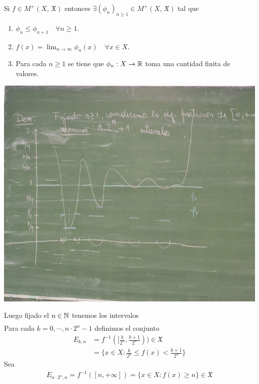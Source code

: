 Si $f \in M^+(X \text{, } \mathfrak{X})$ entonces $\exists (\phi_n)_{n \geq 1} \in M^+(X \text{, } \mathfrak{X})$ tal que \begin{enumerate}
    \item $\phi_n \leq \phi_{n+1} \quad \forall n \geq 1$.
    \item $f(x) = \lim_{n \to \infty} \phi_n(x) \quad \forall x \in X$.
    \item Para cada $n \geq 1$ se tiene que $\phi_n : X \to \mathbb{R}$ toma una cantidad finita de valores.
\end{enumerate}
\begin{center}
    \includegraphics[width=1\textwidth]{Images/clase4.jpeg}
\end{center}
Luego fijado el $n \in \mathbb{N}$ tenemos los intervalos \begin{align*}
    [0, \frac{1}{2}), [\frac{1}{2^n}, \frac{2}{2^n}), \cdots, [\frac{2^{n-1}}{2^n}, \frac{2^n}{2^n}),
    [\frac{2^n}{2^n}, \frac{2^n+1}{2^n}), \cdots, [\frac{n \cdot 2^n - 1}{2^n}, \frac{n \cdot 2^n}{2^n}), [n, +\infty]
\end{align*}
Para cada $k = 0, \cdots, n \cdot 2^n - 1$ definimos el conjunto
\begin{align*}
    E_{k, n} & = f^{-1}([\frac{k}{2^n}, \frac{k+1}{2^n})) \in \mathfrak{X} \\
             & = \{ x \in X : \frac{k}{2^n} \leq f(x) < \frac{k+1}{2^n} \}
\end{align*}
Sea \begin{align*}
    E_{n \cdot 2^n, n} = f^{-1}([n, +\infty]) = \{ x \in X : f(x) \geq n \} \in \mathfrak{X}
\end{align*}

